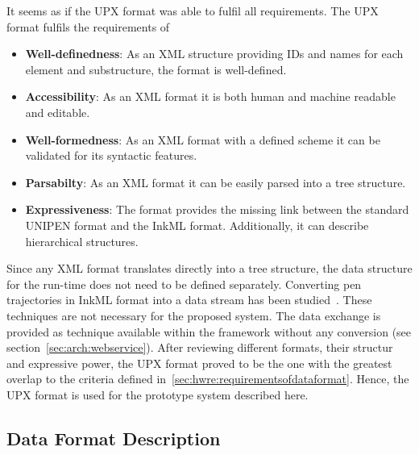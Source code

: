 It seems as if the UPX format was able to fulfil all requirements.
The UPX format fulfils the requirements of
\begin{itemize}
  \item \textbf{Well-definedness}: As an XML structure providing IDs and names 
        for each element and substructure, the format is well-defined.

  \item \textbf{Accessibility}: As an XML format it is both human and machine
        readable and editable.

  \item \textbf{Well-formedness}: As an XML format with a defined scheme it can
        be validated for its syntactic features.

  \item \textbf{Parsabilty}: As an XML format it can be easily parsed into a
        tree structure.

  \item \textbf{Expressiveness}: The format provides the missing link between the
        standard UNIPEN format and the InkML format. Additionally, it can 
        describe hierarchical structures.
\end{itemize}
Since any XML format translates directly into a tree structure, the data 
structure for the run-time does not need to be defined separately.
Converting pen trajectories in InkML format into a data stream has been 
studied~. These techniques are not necessary 
for the proposed system. The data exchange is provided as technique available
within the framework without any conversion (see 
section~\ref{sec:arch:webservice}).
After reviewing different formats, their structur and expressive power,
the UPX format proved to be the one with the greatest overlap to the
criteria defined in~\ref{sec:hwre:requirementsofdataformat}. Hence, the
UPX format is used for the prototype system described here.

\subsection{Data Format Description}
\label{sec:hwre:dataformatdescription}




